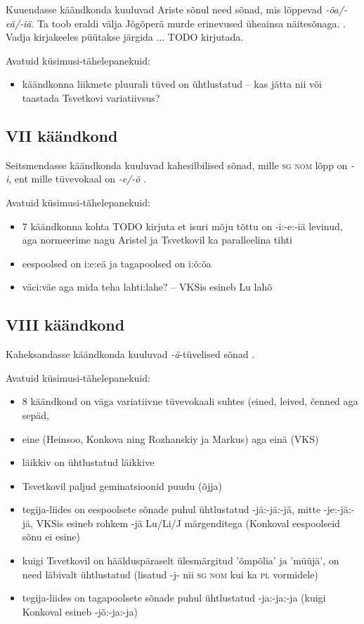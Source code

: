 \documentclass[12pt,a4paper]{article}
\newcommand{\vadja}[1]{\textit{#1}}
\newcommand{\msd}[1]{\textsc{#1}}
\begin{document}
Kuuendasse käändkonda kuuluvad Ariste sõnul need sõnad, mis lõppevad \vadja{-õa/-eä/-iä}. Ta toob eraldi välja Jõgõperä murde erinevused üheainsa näitesõnaga. \cite[44]{ariste_grammar_1968}. Vadja kirjakeeles püütakse järgida ... TODO kirjutada.

Avatuid küsimusi-tähelepanekuid:
\begin{itemize}
\item käändkonna liikmete pluurali tüved on ühtlustatud -- kas jätta nii või taastada Tsvetkovi variatiivsus?
\end{itemize}


\subsection{\RN{7} käändkond}

Seitsmendasse käändkonda kuuluvad kahesilbilised sõnad, mille \msd{sg nom} lõpp on \vadja{-i}, ent mille tüvevokaal on \vadja{-e/-õ} \cite[45]{ariste_grammar_1968}.

Avatuid küsimusi-tähelepanekuid:
\begin{itemize}
\item 7 käändkonna kohta TODO kirjuta et isuri mõju tõttu on -i:-e:-iä levinud, aga normeerime nagu Aristel ja Tsvetkovil ka paralleelina tihti
\item eespoolsed on i:e:eä ja tagapoolsed on i:õ:õa
\item väci:väe aga mida teha lahti:lahe? -- VKSis esineb Lu lahõ
\end{itemize}


\subsection{\RN{8} käändkond}

Kaheksandasse käändkonda kuuluvad \vadja{-ä}-tüvelised sõnad \cite[46]{ariste_grammar_1968}.

Avatuid küsimusi-tähelepanekuid:
\begin{itemize}
\item 8 käändkond on väga variatiivne tüvevokaali suhtes (eined, leived, čenned aga sepäd,
\item eine (Heinsoo, Konkova ning Rozhanskiy ja Markus) aga einä (VKS)
\item läikkiv on ühtlustatud läikkive
\item Tsvetkovil paljud geminatsioonid puudu (õjja)
\item tegija-liides on eespoolsete sõnade puhul ühtlustatud -jä:-jä:-jä, mitte -je:-jä:-jä, VKSis esineb rohkem -jä Lu/Li/J märgenditega (Konkoval eespoolseid sõnu ei esine)
\item kuigi Tsvetkovil on häälduspäraselt ülesmärgitud 'õmpõlia' ja 'müüjä', on need läbivalt ühtlustatud (lisatud -j- nii \msd{sg nom} kui ka \msd{pl} vormidele)
\item tegija-liides on tagapoolsete sõnade puhul ühtlustatud -ja:-ja:-ja (kuigi Konkoval esineb -jõ:-ja:-ja)
\end{itemize}
\end{document}

